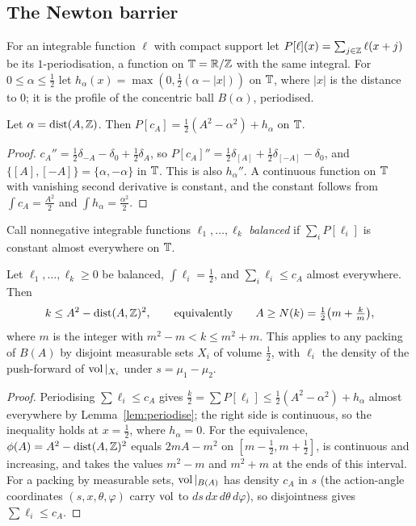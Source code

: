 \documentclass[11pt]{amsart}
\begin{document}
\subsection{The Newton barrier}\label{sec:newton}
For an integrable function $\ell$ with compact support let $P[\ell](x)=\sum_{j\in\mathbb{Z}}\ell(x+j)$ be its
$1$-periodisation, a function on $\mathbb{T}=\mathbb{R}/\mathbb{Z}$ with the same integral. For $0\le\alpha\le\frac12$ let
$h_\alpha(x)=\max(0,\frac12(\alpha-|x|))$ on $\mathbb{T}$, where $|x|$ is the distance to $0$; it is the profile of the
concentric ball $B(\alpha)$, periodised.

\begin{lemma}\label{lem:periodise}
Let $\alpha=\operatorname{dist}(A,\mathbb{Z})$. Then $P[c_A]=\frac12(A^2-\alpha^2)+h_\alpha$ on $\mathbb{T}$.
\end{lemma}

\begin{proof}
$c_A''=\frac12\delta_{-A}-\delta_0+\frac12\delta_A$, so $P[c_A]''=\frac12\delta_{[A]}+\frac12\delta_{[-A]}-\delta_0$,
and $\{[A],[-A]\}=\{\alpha,-\alpha\}$ in $\mathbb{T}$. This is also $h_\alpha''$. A continuous function on $\mathbb{T}$ with vanishing
second derivative is constant, and the constant follows from $\int c_A=\frac{A^2}2$ and $\int h_\alpha=\frac{\alpha^2}2$.
\end{proof}

Call nonnegative integrable functions $\ell_1,\dots,\ell_k$ \emph{balanced} if $\sum_iP[\ell_i]$ is constant almost
everywhere on $\mathbb{T}$.

\begin{theorem}\label{thm:newton}
Let $\ell_1,\dots,\ell_k\ge0$ be balanced, $\int\ell_i=\frac12$, and $\sum_i\ell_i\le c_A$ almost everywhere. Then
\[
k\le A^2-\operatorname{dist}(A,\mathbb{Z})^2,\qquad\text{equivalently}\qquad A\ge N(k)=\tfrac12\bigl(m+\tfrac km\bigr),
\]
where $m$ is the integer with $m^2-m<k\le m^2+m$. This applies to any packing of $B(A)$ by disjoint measurable sets
$X_i$ of volume $\frac12$, with $\ell_i$ the density of the push-forward of $\operatorname{vol}|_{X_i}$ under $s=\mu_1-\mu_2$.
\end{theorem}

\begin{proof}
Periodising $\sum\ell_i\le c_A$ gives $\frac k2=\sum P[\ell_i]\le\frac12(A^2-\alpha^2)+h_\alpha$ almost everywhere by
Lemma~\ref{lem:periodise}; the right side is continuous, so the inequality holds at $x=\frac12$, where
$h_\alpha=0$. For the equivalence, $\phi(A)=A^2-\operatorname{dist}(A,\mathbb{Z})^2$ equals $2mA-m^2$ on $[m-\frac12,m+\frac12]$, is
continuous and increasing, and takes the values $m^2-m$ and $m^2+m$ at the ends of this interval. For a packing by
measurable sets, $\operatorname{vol}|_{B(A)}$ has density $c_A$ in $s$ (the action-angle coordinates
$(s,x,\theta,\varphi)$ carry $\operatorname{vol}$ to $ds\,dx\,d\theta\,d\varphi$), so disjointness gives $\sum\ell_i\le c_A$.
\end{proof}
\end{document}
